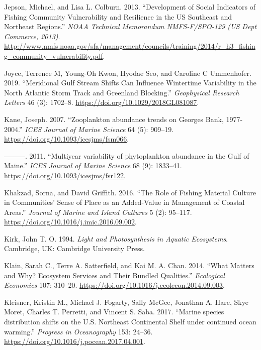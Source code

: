 \documentclass[
]{book}
\newlength{\cslhangindent}
\newenvironment{cslreferences}%
  {\setlength{\parindent}{0pt}%
  \everypar{\setlength{\hangindent}{\cslhangindent}}\ignorespaces}%
  {\par}
\begin{document}
\begin{cslreferences}
\leavevmode\hypertarget{ref-jepson_development_2013}{}%
Jepson, Michael, and Lisa L. Colburn. 2013. ``Development of Social Indicators of Fishing Community Vulnerability and Resilience in the US Southeast and Northeast Regions.'' \emph{NOAA Technical Memorandum NMFS-F/SPO-129 (US Dept Commerce, 2013)}. \url{http://www.nmfs.noaa.gov/sfa/management/councils/training/2014/r_h3_fishing_community_vulnerability.pdf}.

\leavevmode\hypertarget{ref-joyce2019}{}%
Joyce, Terrence M, Young-Oh Kwon, Hyodae Seo, and Caroline C Ummenhofer. 2019. ``Meridional Gulf Stream Shifts Can Influence Wintertime Variability in the North Atlantic Storm Track and Greenland Blocking.'' \emph{Geophysical Research Letters} 46 (3): 1702--8. \url{https://doi.org/10.1029/2018GL081087}.

\leavevmode\hypertarget{ref-Kane2007}{}%
Kane, Joseph. 2007. ``Zooplankton abundance trends on Georges Bank, 1977-2004.'' \emph{ICES Journal of Marine Science} 64 (5): 909--19. \url{https://doi.org/10.1093/icesjms/fsm066}.

\leavevmode\hypertarget{ref-Kane2011}{}%
---------. 2011. ``Multiyear variability of phytoplankton abundance in the Gulf of Maine.'' \emph{ICES Journal of Marine Science} 68 (9): 1833--41. \url{https://doi.org/10.1093/icesjms/fsr122}.

\leavevmode\hypertarget{ref-khakzad_role_2016}{}%
Khakzad, Sorna, and David Griffith. 2016. ``The Role of Fishing Material Culture in Communities' Sense of Place as an Added-Value in Management of Coastal Areas.'' \emph{Journal of Marine and Island Cultures} 5 (2): 95--117. \url{https://doi.org/10.1016/j.imic.2016.09.002}.

\leavevmode\hypertarget{ref-SOE6}{}%
Kirk, John T. O. 1994. \emph{Light and Photosynthesis in Aquatic Ecosystems}. Cambridge, UK: Cambridge University Press.

\leavevmode\hypertarget{ref-klain_what_2014}{}%
Klain, Sarah C., Terre A. Satterfield, and Kai M. A. Chan. 2014. ``What Matters and Why? Ecosystem Services and Their Bundled Qualities.'' \emph{Ecological Economics} 107: 310--20. \url{https://doi.org/10.1016/j.ecolecon.2014.09.003}.

\leavevmode\hypertarget{ref-Kleisner2017}{}%
Kleisner, Kristin M., Michael J. Fogarty, Sally McGee, Jonathan A. Hare, Skye Moret, Charles T. Perretti, and Vincent S. Saba. 2017. ``Marine species distribution shifts on the U.S. Northeast Continental Shelf under continued ocean warming.'' \emph{Progress in Oceanography} 153: 24--36. \url{https://doi.org/10.1016/j.pocean.2017.04.001}.


\end{cslreferences}
\end{document}
